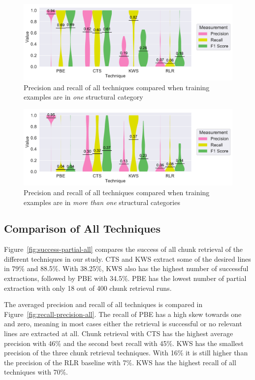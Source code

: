 \documentclass[\myrootdir/main.tex]{subfiles}
\begin{document}
\begin{figure}[htbp]
	\centering
		\includegraphics[width=\textwidth, clip]{img/big-study/recall-precision-singlecategory-all.pdf}
		\caption{Precision and recall of all techniques compared when training examples are in \emph{one} structural category}
		\label{fig:recall-precision-singlecategory-all}
\end{figure}

\begin{figure}[htbp]
		\centering
		\includegraphics[width=\textwidth, clip]{img/big-study/recall-precision-multicategory-all.pdf}
		\caption{Precision and recall of all techniques compared when training examples are in \emph{more than one} structural categories}
		\label{fig:recall-precision-multicategory-all}
\end{figure}

\subsection{Comparison of All Techniques}
Figure~\ref{fig:success-partial-all} compares the success of all chunk retrieval of the different techniques in our study.
CTS and KWS extract some of the desired lines in 79\% and 88.5\%.
With 38.25\%, KWS also has the highest number of successful extractions, followed by PBE with 34.5\%.
PBE has the lowest number of partial extraction with only 18 out of 400 chunk retrieval runs.

The averaged precision and recall of all techniques is compared in Figure~\ref{fig:recall-precision-all}.
The recall of PBE has a high skew towards one and zero, meaning in most cases either the retrieval is successful or no relevant lines are extracted at all.
Chunk retrieval with CTS has the highest average precision with 46\% and the second best recall with 45\%.
KWS has the smallest precision of the three chunk retrieval techniques.
With 16\% it is still higher than the precision of the RLR baseline with 7\%.
KWS has the highest recall of all techniques with 70\%.
\end{document}
